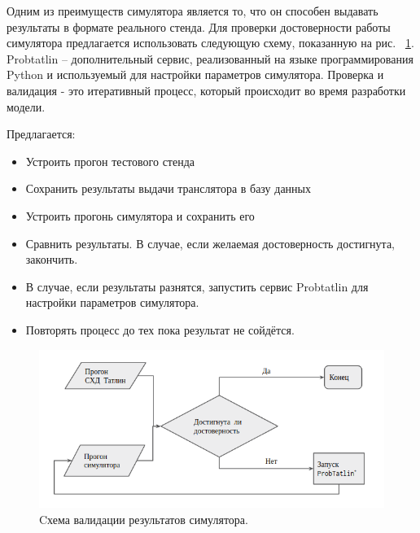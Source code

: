 \par Одним из преимуществ симулятора является то, что он способен выдавать результаты в формате реального стенда. Для проверки достоверности работы симулятора предлагается использовать следующую схему, показанную на рис. ~\ref{fig:probtatlin}. Probtatlin -- дополнительный сервис, реализованный на языке программирования Python и используемый для настройки параметров симулятора. Проверка и валидация - это итеративный процесс, который происходит во время разработки модели.
\par Предлагается:
\begin{itemize}
\item Устроить прогон тестового стенда
\item Сохранить результаты выдачи транслятора в базу данных
\item Устроить прогонь симулятора и сохранить его
\item Сравнить результаты. В случае, если желаемая достоверность достигнута, закончить.
\item В случае, если результаты разнятся, запустить сервис Probtatlin для настройки параметров симулятора.
\item Повторять процесс до тех пока результат не сойдётся.

\end{itemize}


\begin{figure}[!ht]
\centering
\includegraphics[width=\textwidth]{Kenenbek/images/probtatlin.png}
\caption{Cхема валидации результатов симулятора.}
\label{fig:probtatlin}
\end{figure}

\par 


